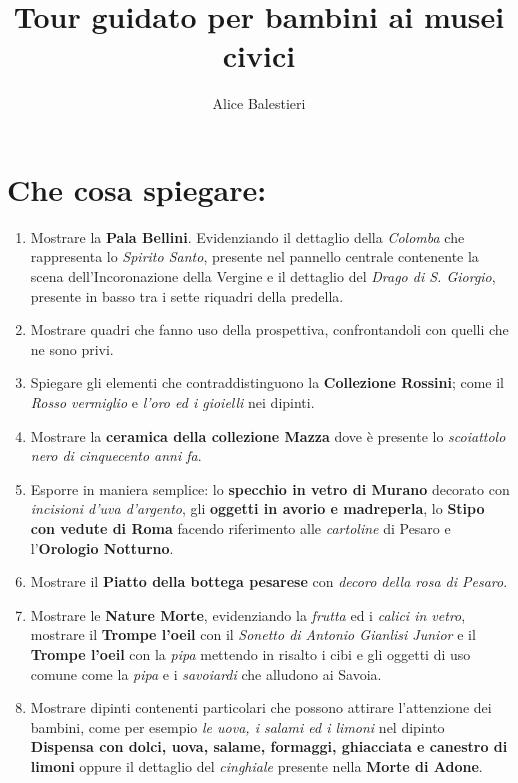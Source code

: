 \documentclass[12pt,a4paper]{article}
\begin{document}
\title{\textbf{Tour guidato per bambini ai musei civici}}
\author{Alice Balestieri}
\date{}

\maketitle
\newpage

\section{Che cosa spiegare:}

	\begin{enumerate}
		
	\item Mostrare la \textbf{Pala Bellini}. Evidenziando il dettaglio della \textit{Colomba} che rappresenta lo \textit{Spirito Santo}, presente nel pannello centrale contenente la scena dell'Incoronazione della Vergine e il dettaglio del \textit{Drago di S. Giorgio}, presente in basso tra i sette riquadri della predella.
	\item Mostrare quadri che fanno uso della prospettiva, confrontandoli con quelli che ne sono privi.  
	\item Spiegare gli elementi che contraddistinguono la \textbf{Collezione Rossini}; come il \textit{Rosso vermiglio} e \textit{l'oro ed i gioielli} nei dipinti.
	\item Mostrare la \textbf{ceramica della collezione Mazza} dove è presente lo \textit{scoiattolo nero di cinquecento anni fa}.
	\item Esporre in maniera semplice: lo \textbf{specchio in vetro di Murano} decorato con \textit{incisioni d'uva d'argento},  gli \textbf{oggetti in avorio e madreperla}, lo \textbf{Stipo con vedute di Roma} facendo riferimento alle \textit{cartoline} di Pesaro e l'\textbf{Orologio Notturno}.
	\item Mostrare il \textbf{Piatto della bottega pesarese} con \textit{decoro della rosa di Pesaro}.
	\item Mostrare le \textbf{Nature Morte}, evidenziando la \textit{frutta} ed i \textit{calici in vetro}, mostrare il \textbf{Trompe l'oeil} con il \textit{Sonetto di Antonio Gianlisi Junior} e il \textbf{Trompe l'oeil} con la \textit{pipa} mettendo in risalto i cibi e gli oggetti di uso comune come la \textit{pipa} e i \textit{savoiardi} che alludono ai Savoia.
	\item Mostrare dipinti contenenti particolari che possono attirare l'attenzione dei bambini, come per esempio \textit{le uova, i salami ed i limoni} nel dipinto \textbf{Dispensa con dolci, uova, salame, formaggi, ghiacciata e canestro di limoni} oppure il dettaglio del \textit{cinghiale} presente nella \textbf{Morte di Adone}.
	
	\end{enumerate}
\end{document}
